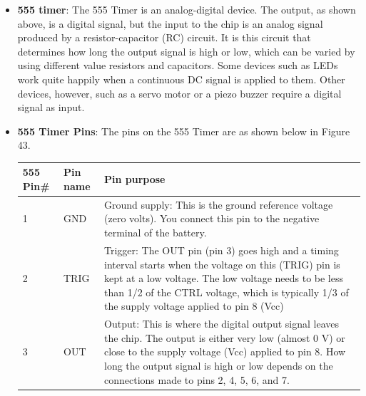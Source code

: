 \documentclass{report}
\begin{document}
\begin{itemize}
            \begin{itemize}
                \item \textbf{Analog:} Uses continuous, smooth signals (like a sine wave) that can take any value in a range. Think of turning a volume knob or looking at a clock with hands.
                \item \textbf{Digital:} Uses separate, step-like values (like a square wave) represented as binary numbers (1s and 0s, or on and off). Think of flipping a light switch or reading a digital watch
            \end{itemize}
            Analog circuits process continuously changing voltage or current signals, while digital circuits process information using discrete, on-off binary states (1s and 0s)
        \item \textbf{555 timer}: The 555 Timer is an analog-digital device. The output, as shown above, is a digital signal, but the input to the chip is an analog signal produced by a resistor-capacitor (RC) circuit. It is this circuit that determines how long the output signal is high or low, which can be varied by using different value resistors and capacitors.
            \bigbreak \noindent 
            Some devices such as LEDs work quite happily when a continuous DC signal is applied to them. Other devices, however, such as a servo motor or a piezo buzzer require a digital signal as input.
        \item \textbf{555 Timer Pins}: The pins on the 555 Timer are as shown below in Figure 43.
            \bigbreak \noindent 
            \bigbreak \noindent 
            \begin{center}
                \begin{tabularx}{\textwidth}{@{}llX@{}}
                    \toprule
                    \textbf{555 Pin\#}& \textbf{Pin name}& \textbf{Pin purpose} \\
                    \midrule
                    1 &GND&  Ground supply: This is the ground reference voltage (zero volts). You connect this pin to the negative terminal of the battery.\\[2ex]
                    2& TRIG& Trigger: The OUT pin (pin 3) goes high and a timing interval starts when the voltage on this (TRIG) pin is kept at a low voltage. The low voltage needs to be less than 1/2 of the CTRL voltage, which is typically 1/3 of the supply voltage applied to pin 8 (Vcc)\\[2ex]
                    3& OUT& Output: This is where the digital output signal leaves the chip. The output is either very low (almost 0 V) or close to the supply voltage (Vcc) applied to pin 8. How long the output signal is high or low depends on the connections made to pins 2, 4, 5, 6, and 7.\\[2ex]

\end{tabularx}
\end{center}
\end{itemize}
\end{document}
